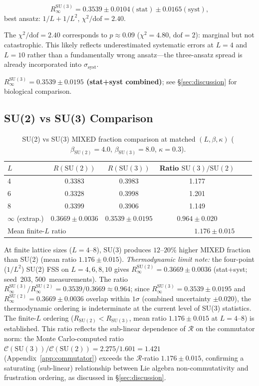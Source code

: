 \documentclass[12pt,a4paper]{article}
\newcommand{\R}{\mathcal{R}}           %
\newcommand{\SU}[1]{\mathrm{SU}(#1)}
\theoremstyle{plain}
\theoremstyle{definition}
\theoremstyle{remark}
\begin{document}
\begin{equation*}
  R_\infty^{\SU{3}} = 0.3539 \pm 0.0104(\text{stat}) \pm 0.0165(\text{syst}),
\end{equation*}
best ansatz: $1/L+1/L^2$, $\chi^2/\text{dof} = 2.40$.

\noindent The $\chi^2/\text{dof}=2.40$ corresponds to $p\approx0.09$ ($\chi^2=4.80$,
$\text{dof}=2$): marginal but not catastrophic. This likely reflects underestimated
systematic errors at $L=4$ and $L=10$ rather than a fundamentally wrong ansatz---the
three-ansatz spread is already incorporated into $\sigma_\text{syst}$.

\textbf{$R_\infty^{\SU{3}} = 0.3539 \pm 0.0195$ (stat+syst combined)}; see §\ref{sec:discussion} for biological comparison.

\subsection{SU(2) vs SU(3) Comparison}

\begin{table}[ht]
\centering
\caption{SU(2) vs SU(3) MIXED fraction comparison at matched $(L,\beta,\kappa)$
($\beta_{\SU{2}}=4.0$, $\beta_{\SU{3}}=8.0$, $\kappa=0.3$).}
\label{tab:su23_comparison}
\begin{tabular}{lccccc}
\toprule
$L$ & $R(\SU{2})$ & $R(\SU{3})$ & Ratio $\SU{3}/\SU{2}$ \\
\midrule
4 & 0.3383 & 0.3983 & 1.177 \\
6 & 0.3328 & 0.3998 & 1.201 \\
8 & 0.3399 & 0.3906 & 1.149 \\
$\infty$ (extrap.) & $0.3669\pm0.0036$ & $0.3539\pm0.0195$ & $0.964\pm0.020$ \\
\midrule
\multicolumn{2}{l}{Mean finite-$L$ ratio} & \multicolumn{2}{r}{$\mathbf{1.176\pm0.015}$} \\
\bottomrule
\end{tabular}
\end{table}

At finite lattice sizes ($L=4$--$8$), SU(3) produces $12$--$20\%$ higher MIXED
fraction than SU(2) (mean ratio $1.176\pm0.015$).
\emph{Thermodynamic limit note:} the four-point ($1/L^2$) SU(2) FSS on $L=4,6,8,10$ gives
$R_\infty^{\SU{2}}=0.3669\pm0.0036$ (stat$+$syst; seed~203, 500~measurements).
The ratio $R_\infty^{\SU{3}}/R_\infty^{\SU{2}}=0.3539/0.3669\approx0.964$; since
$R_\infty^{\SU{3}}=0.3539\pm0.0195$ and $R_\infty^{\SU{2}}=0.3669\pm0.0036$ overlap
within $1\sigma$ (combined uncertainty $\pm0.020$), the thermodynamic ordering is
indeterminate at the current level of SU(3) statistics. The finite-$L$ ordering
($R_{\SU{2}}<R_{\SU{3}}$, mean ratio $1.176\pm0.015$ at $L=4$--$8$) is established.
This ratio reflects the sub-linear dependence of $\R$ on the commutator norm:
the Monte Carlo-computed ratio $\mathcal{C}(\SU{3})/\mathcal{C}(\SU{2})=2.275/1.601=1.421$
(Appendix~\ref{app:commutator}) exceeds the $\R$-ratio $1.176\pm0.015$,
confirming a saturating (sub-linear) relationship between Lie algebra
non-commutativity and frustration ordering, as discussed in §\ref{sec:discussion}.
\end{document}
